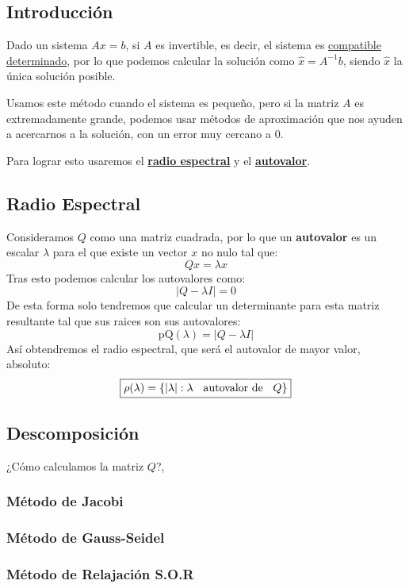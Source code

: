 \subsection{Introducción}
Dado un sistema \(Ax=b\), si \(A\) es invertible, es decir, el sistema es \underline{compatible determinado}, por lo que podemos calcular la solución como \(\hat{x} = A^{-1}b\), siendo \(\hat{x}\) la única solución posible. \par
Usamos este método cuando el sistema es pequeño, pero si la matriz \(A\) es extremadamente grande, podemos usar métodos de aproximación que nos ayuden a acercarnos a la solución, con un error muy cercano a 0. \par
Para lograr esto usaremos el \underline{\textbf{radio espectral}} y el \underline{\textbf{autovalor}}.
\subsection{Radio Espectral}
Consideramos \(Q\) como una matriz cuadrada, por lo que un \textbf{autovalor} es un escalar \(\lambda\) para el que existe un vector \(x\) no nulo tal que:
\[
        Qx = \lambda x
\]
Tras esto podemos calcular los autovalores como:
\[
        \boxed{\left | Q - \lambda I \right | = 0}
\]
De esta forma solo tendremos que calcular un determinante para esta matriz resultante tal que sus raices son sus autovalores:
\[
        \boxed{\text{pQ}(\lambda) = \left | Q - \lambda I \right |}
\]
Así obtendremos el radio espectral, que será el autovalor de mayor valor, absoluto:
\[
        \boxed{\rho(\lambda) = \left \{ \left | \lambda \right | : \lambda \text{\hspace{2mm} autovalor de \hspace{2mm}} Q \right \}}
\]
\subsection{Descomposición}
¿Cómo calculamos la matriz \(Q\)?,
\subsubsection{Método de Jacobi}
\subsubsection{Método de Gauss-Seidel}
\subsubsection{Método de Relajación S.O.R}
